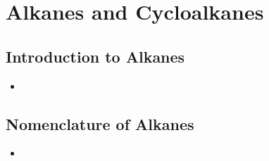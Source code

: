 \documentclass[12pt,a4paper]{article}
\begin{document}

\clearpage
\section{Alkanes and Cycloalkanes}
\subsection{Introduction to Alkanes}
\begin{itemize}
    \item 
\end{itemize}

\subsection{Nomenclature of Alkanes}
\begin{itemize}
    \item 
\end{itemize}
\end{document}

